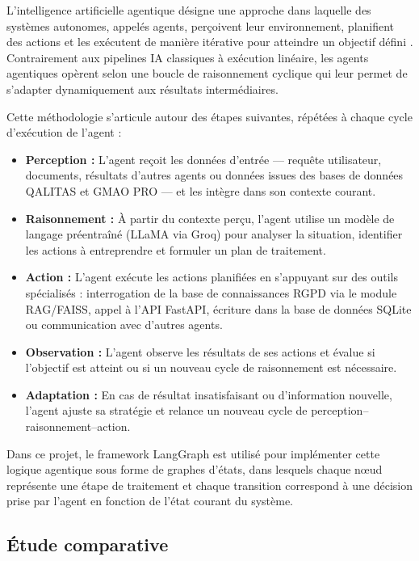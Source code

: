 \documentclass[12pt,a4paper]{report}
\begin{document}
L'intelligence artificielle agentique désigne une approche dans laquelle des systèmes autonomes, appelés agents, perçoivent leur environnement, planifient des actions et les exécutent de manière itérative pour atteindre un objectif défini \cite{wooldridge_agents}. Contrairement aux pipelines IA classiques à exécution linéaire, les agents agentiques opèrent selon une boucle de raisonnement cyclique qui leur permet de s'adapter dynamiquement aux résultats intermédiaires.

Cette méthodologie s'articule autour des étapes suivantes, répétées à chaque cycle d'exécution de l'agent \cite{chase_langgraph} :

\begin{itemize}[leftmargin=*, label=\textbullet]
    \item \textbf{Perception :} L'agent reçoit les données d'entrée --- requête utilisateur, documents, résultats d'autres agents ou données issues des bases de données QALITAS et GMAO PRO --- et les intègre dans son contexte courant.
    \item \textbf{Raisonnement :} À partir du contexte perçu, l'agent utilise un modèle de langage préentraîné (LLaMA via Groq) pour analyser la situation, identifier les actions à entreprendre et formuler un plan de traitement.
    \item \textbf{Action :} L'agent exécute les actions planifiées en s'appuyant sur des outils spécialisés : interrogation de la base de connaissances RGPD via le module RAG/FAISS, appel à l'API FastAPI, écriture dans la base de données SQLite ou communication avec d'autres agents.
    \item \textbf{Observation :} L'agent observe les résultats de ses actions et évalue si l'objectif est atteint ou si un nouveau cycle de raisonnement est nécessaire.
    \item \textbf{Adaptation :} En cas de résultat insatisfaisant ou d'information nouvelle, l'agent ajuste sa stratégie et relance un nouveau cycle de perception--raisonnement--action.
\end{itemize}

Dans ce projet, le framework LangGraph est utilisé pour implémenter cette logique agentique sous forme de graphes d'états, dans lesquels chaque nœud représente une étape de traitement et chaque transition correspond à une décision prise par l'agent en fonction de l'état courant du système.

\subsection{Étude comparative}
\end{document}
